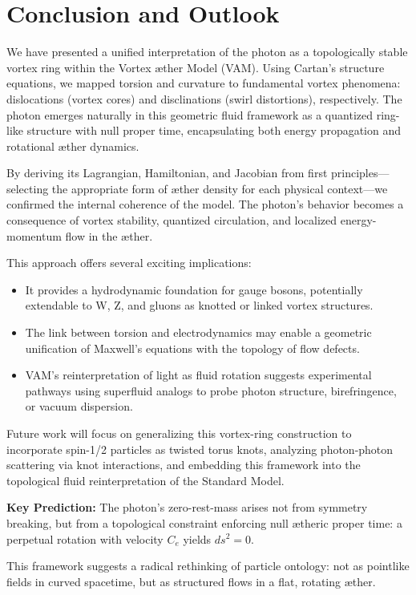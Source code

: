 \section{Conclusion and Outlook}

    We have presented a unified interpretation of the photon as a topologically stable vortex ring within the Vortex \ae ther Model (VAM). Using Cartan’s structure equations, we mapped torsion and curvature to fundamental vortex phenomena: dislocations (vortex cores) and disclinations (swirl distortions), respectively. The photon emerges naturally in this geometric fluid framework as a quantized ring-like structure with null proper time, encapsulating both energy propagation and rotational æther dynamics.


    By deriving its Lagrangian, Hamiltonian, and Jacobian from first principles—selecting the appropriate form of æther density for each physical context—we confirmed the internal coherence of the model. The photon's behavior becomes a consequence of vortex stability, quantized circulation, and localized energy-momentum flow in the æther.


    This approach offers several exciting implications:

    \begin{itemize}

    \item It provides a hydrodynamic foundation for gauge bosons, potentially extendable to W, Z, and gluons as knotted or linked vortex structures.

    \item The link between torsion and electrodynamics may enable a geometric unification of Maxwell’s equations with the topology of flow defects.

    \item VAM’s reinterpretation of light as fluid rotation suggests experimental pathways using superfluid analogs to probe photon structure, birefringence, or vacuum dispersion.

    \end{itemize}


    Future work will focus on generalizing this vortex-ring construction to incorporate spin-1/2 particles as twisted torus knots, analyzing photon-photon scattering via knot interactions, and embedding this framework into the topological fluid reinterpretation of the Standard Model.


    \medskip

    \noindent\textbf{Key Prediction:} The photon's zero-rest-mass arises not from symmetry breaking, but from a topological constraint enforcing null ætheric proper time: a perpetual rotation with velocity $C_e$ yields $ds^2 = 0$.


    \medskip

    \noindent This framework suggests a radical rethinking of particle ontology: not as pointlike fields in curved spacetime, but as structured flows in a flat, rotating æther.